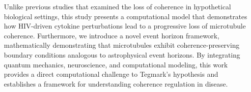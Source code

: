 Unlike previous studies that examined the loss of coherence in hypothetical biological settings, this study presents a computational model that demonstrates how HIV-driven cytokine perturbations lead to a progressive loss of microtubule coherence. Furthermore, we introduce a novel event horizon framework, mathematically demonstrating that microtubules exhibit coherence-preserving boundary conditions analogous to astrophysical event horizons. By integrating quantum mechanics, neuroscience, and computational modeling, this work provides a direct computational challenge to Tegmark's hypothesis and establishes a framework for understanding coherence regulation in disease.

